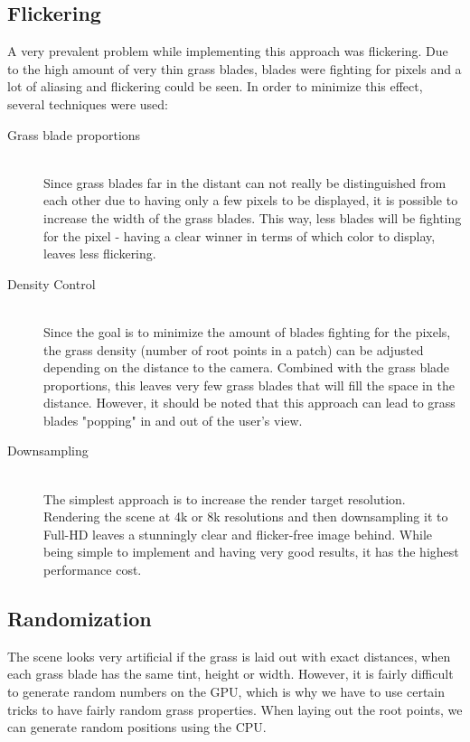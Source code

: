 \documentclass[conference]{acmsiggraph}
\begin{document}
\subsection{Flickering}
A very prevalent problem while implementing this approach was flickering. Due to the high amount of very thin grass blades, blades were fighting for pixels and a lot of aliasing and flickering could be seen. In order to minimize this effect, several techniques were used:

\begin{description}
  \item[Grass blade proportions] \hfill \\
  Since grass blades far in the distant can not really be distinguished from each other due to having only a few pixels to be displayed, it is possible to increase the width of the grass blades. This way, less blades will be fighting for the pixel - having a clear winner in terms of which color to display, leaves less flickering.
  \item[Density Control] \hfill \\
  Since the goal is to minimize the amount of blades fighting for the pixels, the grass density (number of root points in a patch) can be adjusted depending on the distance to the camera. Combined with the grass blade proportions, this leaves very few grass blades that will fill the space in the distance. However, it should be noted that this approach can lead to grass blades "popping" in and out of the user's view. \cite{KevinBoulanger}
  \item[Downsampling] \hfill \\
  The simplest approach is to increase the render target resolution. Rendering the scene at 4k or 8k resolutions and then downsampling it to Full-HD leaves a stunningly clear and flicker-free image behind. While being simple to implement and having very good results, it has the highest performance cost. 
\end{description}

\subsection{Randomization}

The scene looks very artificial if the grass is laid out with exact distances, when each grass blade has the same tint, height or width. However, it is fairly difficult to generate random numbers on the GPU, which is why we have to use certain tricks to have fairly random grass properties. When laying out the root points, we can generate random positions using the CPU.
\end{document}
